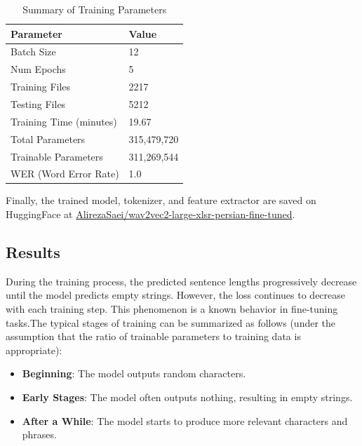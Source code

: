 \documentclass{article}
\begin{document}
\begin{table}[h]
    \centering
    \begin{tabular}{|l|l|}
        \hline
        \textbf{Parameter}                & \textbf{Value}       \\ \hline
        Batch Size                        & 12                   \\ \hline
        Num Epochs                        & 5                    \\ \hline
        Training Files                    & 2217                 \\ \hline
        Testing Files                     & 5212                 \\ \hline
        Training Time (minutes)           & 19.67                \\ \hline
        Total Parameters                  & 315,479,720          \\ \hline
        Trainable Parameters              & 311,269,544          \\ \hline
        WER (Word Error Rate)             & 1.0                  \\ \hline
    \end{tabular}
    \caption{Summary of Training Parameters}
    \label{tab:training_summary}
\end{table}


Finally, the trained model, tokenizer, and feature extractor are saved on HuggingFace at \href{https://huggingface.co/AlirezaSaei/wav2vec2-large-xlsr-persian-fine-tuned}{AlirezaSaei/wav2vec2-large-xlsr-persian-fine-tuned}.

\pagebreak

\subsection{Results}

During the training process, the predicted sentence lengths progressively decrease until the model predicts empty strings. However, the loss continues to decrease with each training step. This phenomenon is a known behavior in fine-tuning tasks.The typical stages of training can be summarized as follows (under the assumption that the ratio of trainable parameters to training data is appropriate):

\begin{itemize}
    \item \textbf{Beginning}: The model outputs random characters.
    \item \textbf{Early Stages}: The model often outputs nothing, resulting in empty strings.
    \item \textbf{After a While}: The model starts to produce more relevant characters and phrases.
\end{itemize}
\end{document}
